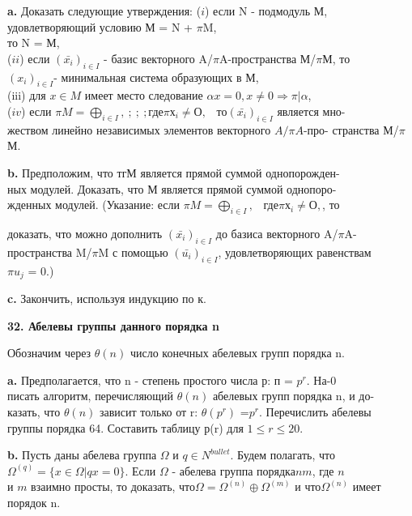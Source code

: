 \medskip

{\bf a.} Доказать следующие утверждения: 
($i$) если N - подмодуль М, удовлетворяющий условию М = N + $\pi$M,\\ 
то N = М,\\ 
($ii$) если $(\bar{x_i})_{i\in I}$ - базис векторного A/$\pi$A-пространства М/$\pi$М, то \\
$(x_i)_{i\in I}$- минимальная система образующих в М, \\
(iii) для $x\in M$ имеет место следование $ \alpha x=0,x\ne 0 \Rightarrow\pi|\alpha $, \\
($iv$) если $ \pi M = \bigoplus_{i\in I} ,\ ;\ ;\ ;\text{где} \pi х_i\ne О, \;\;\;\text{то} (\bar{x_i})_{i\in I}$ является 
мно-\\жеством линейно независимых элементов векторного $A/ \pi A$-про- 
странства М/$\pi$М.

\medskip

{\bf b.} Предположим, что тгМ является прямой суммой 
однопорожден-\\ных модулей. Доказать, что М является прямой суммой однопоро- \\
жденных модулей. (Указание: если $ \pi M = \bigoplus_{i\in I} ,\;\;\;\text{где} \pi х_i\ne О, $\;\;\;, то

\pagebreak

доказать, что можно дополнить  $(\bar{x_i})_{i\in I}$ до базиса векторного A/$\pi$A-\\ 
пространства M/$\pi$M с помощью  $(\bar{u_i})_{i\in I}$, удовлетворяющих равенствам \\
$\pi u_j$ = 0.) 


{\bf c.} Закончить, используя индукцию по к. 



{\noindent\bf32. Абелевы группы данного порядка n}

Обозначим через $\theta(n)$ число конечных абелевых групп порядка n. 


{\bf a.} Предполагается, что n - степень простого числа р: п = $p^r$. 
На-0\\
писать алгоритм, перечисляющий $\theta(n)$ абелевых групп порядка n, и 
до-\\
казать, что $\theta(n)$ зависит только от r: $\theta(p^r)$ =$p^r$. Перечислить абелевы \\
группы порядка 64. Составить таблицу р(r) для $1 \leqslant r \leqslant 20$. 



{\bf b.} Пусть даны абелева группа $\Omega$ и $ q \in N^{bullet}$. Будем полагать, что \\
$\Omega^{(q)}=\{ x\in\Omega|qx=0 \}$. Если $\Omega$ - абелева группа порядка$ nm$, где $n$\\
и $m$ взаимно просты, то доказать, что$\Omega=\Omega^{(n)} \oplus \Omega^{(m)}$ и что$\Omega^{(n)}$ имеет 
порядок n. 


